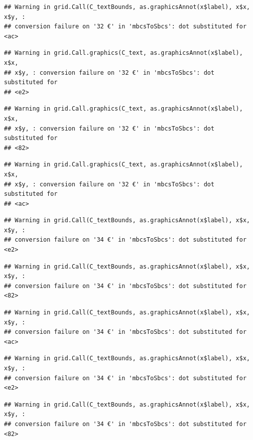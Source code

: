 \documentclass[]{gitbook}
\begin{document}
\begin{verbatim}
## Warning in grid.Call(C_textBounds, as.graphicsAnnot(x$label), x$x, x$y, :
## conversion failure on '32 €' in 'mbcsToSbcs': dot substituted for <ac>
\end{verbatim}

\begin{verbatim}
## Warning in grid.Call.graphics(C_text, as.graphicsAnnot(x$label), x$x,
## x$y, : conversion failure on '32 €' in 'mbcsToSbcs': dot substituted for
## <e2>
\end{verbatim}

\begin{verbatim}
## Warning in grid.Call.graphics(C_text, as.graphicsAnnot(x$label), x$x,
## x$y, : conversion failure on '32 €' in 'mbcsToSbcs': dot substituted for
## <82>
\end{verbatim}

\begin{verbatim}
## Warning in grid.Call.graphics(C_text, as.graphicsAnnot(x$label), x$x,
## x$y, : conversion failure on '32 €' in 'mbcsToSbcs': dot substituted for
## <ac>
\end{verbatim}

\begin{verbatim}
## Warning in grid.Call(C_textBounds, as.graphicsAnnot(x$label), x$x, x$y, :
## conversion failure on '34 €' in 'mbcsToSbcs': dot substituted for <e2>
\end{verbatim}

\begin{verbatim}
## Warning in grid.Call(C_textBounds, as.graphicsAnnot(x$label), x$x, x$y, :
## conversion failure on '34 €' in 'mbcsToSbcs': dot substituted for <82>
\end{verbatim}

\begin{verbatim}
## Warning in grid.Call(C_textBounds, as.graphicsAnnot(x$label), x$x, x$y, :
## conversion failure on '34 €' in 'mbcsToSbcs': dot substituted for <ac>
\end{verbatim}

\begin{verbatim}
## Warning in grid.Call(C_textBounds, as.graphicsAnnot(x$label), x$x, x$y, :
## conversion failure on '34 €' in 'mbcsToSbcs': dot substituted for <e2>
\end{verbatim}

\begin{verbatim}
## Warning in grid.Call(C_textBounds, as.graphicsAnnot(x$label), x$x, x$y, :
## conversion failure on '34 €' in 'mbcsToSbcs': dot substituted for <82>
\end{verbatim}
\end{document}
